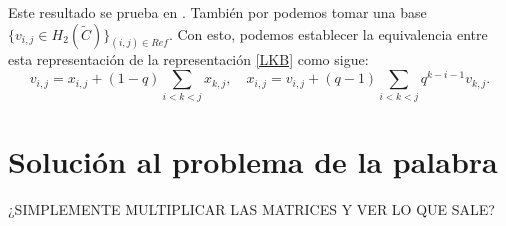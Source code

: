 \documentclass[TFG.tex]{subfiles}
\begin{document}
Este resultado se prueba en \cite{Bil}. También por \cite{Bil} podemos tomar una base $\{v_{i,j}\in H_2(\tilde{C})\}_{(i,j)\in Ref}$. Con esto, podemos establecer la equivalencia \cite{nundam} entre esta representación de la representación  \ref{LKB} como sigue:
\[
v_{i,j}=x_{i,j}+(1-q)\sum_{i<k<j}x_{k,j},\quad x_{i,j}=v_{i,j}+(q-1)\sum_{i<k<j}q^{k-i-1}v_{k,j}.
\]


\section{Solución al problema de la palabra}
¿SIMPLEMENTE MULTIPLICAR LAS MATRICES Y VER LO QUE SALE?
\begin{ej}
\end{ej}
\end{document}
